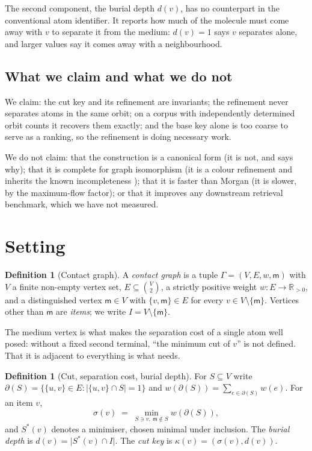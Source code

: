 \documentclass[11pt,twocolumn,a4paper]{article}
\theoremstyle{crthm}
\theoremstyle{definition}
\newtheorem{definition}[theorem]{Definition}
\theoremstyle{remark}
\newcommand{\R}{\mathbb{R}}
\newcommand{\Gph}{\Gamma}
\newcommand{\V}{V}
\newcommand{\E}{E}
\newcommand{\wt}{w}
\newcommand{\med}{\mathsf{m}}
\newcommand{\cut}{\partial}
\newcommand{\sep}{\sigma}
\newcommand{\dep}{d}
\newcommand{\key}{\kappa}
\newcommand{\abs}[1]{\lvert#1\rvert}
\begin{document}
The second component, the burial depth $\dep(v)$, has no counterpart in
the conventional atom identifier. It reports how much of the molecule must
come away with $v$ to separate it from the medium: $\dep(v)=1$ says $v$
separates alone, and larger values say it comes away with a
neighbourhood.

\subsection{What we claim and what we do not}

We claim: the cut key and its refinement are invariants; the refinement
never separates atoms in the same orbit; on a corpus with independently
determined orbit counts it recovers them exactly; and the base key alone
is too coarse to serve as a ranking, so the refinement is doing necessary
work.

We do not claim: that the construction is a canonical form (it is not, and
 says why); that it is complete for graph isomorphism (it
is a colour refinement and inherits the known incompleteness
\citep{cai1992}); that it is faster than Morgan (it is slower, by the
maximum-flow factor); or that it improves any downstream retrieval
benchmark, which we have not measured.

\section{Setting}
\label{sec:setting}

\begin{definition}[Contact graph]
\label{def:graph}
A \emph{contact graph} is a tuple $\Gph=(\V,\E,\wt,\med)$ with $\V$ a
finite non-empty vertex set, $\E\subseteq\binom{\V}{2}$, a strictly
positive weight $\wt\colon\E\to\R_{>0}$, and a distinguished vertex
$\med\in\V$ with $\{v,\med\}\in\E$ for every $v\in\V\setminus\{\med\}$.
Vertices other than $\med$ are \emph{items}; we write
$I=\V\setminus\{\med\}$.
\end{definition}

The medium vertex is what makes the separation cost of a single atom well
posed: without a fixed second terminal, ``the minimum cut of $v$'' is not
defined. That it is adjacent to everything is what
 needs.

\begin{definition}[Cut, separation cost, burial depth]
\label{def:cut}
For $S\subseteq\V$ write
$\cut(S)=\{\{u,v\}\in\E : \abs{\{u,v\}\cap S}=1\}$ and
$\wt(\cut(S))=\sum_{e\in\cut(S)}\wt(e)$. For an item $v$,
\begin{equation}
\sep(v)\;=\;\min_{S\ni v,\ \med\notin S}\wt(\cut(S)),
\label{eq:sep}
\end{equation}
and $S^{*}(v)$ denotes a minimiser, chosen minimal under inclusion. The
\emph{burial depth} is $\dep(v)=\abs{S^{*}(v)\cap I}$. The \emph{cut key}
is $\key(v)=(\sep(v),\dep(v))$.
\end{definition}
\end{document}
